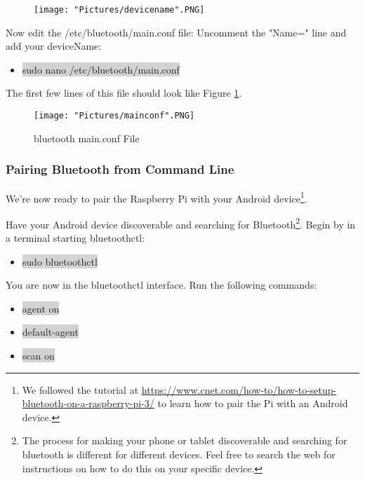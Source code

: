 \documentclass[12pt]{article}
\begin{document}
\begin{figure}[H]
 	\centering
	\texttt{[image: "Pictures/devicename".PNG]}
\end{figure}

\noindent Now edit the /etc/bluetooth/main.conf file: Uncomment the "Name=" line and add your deviceName: 
\begin{itemize}
	\item[] \colorbox{lightgray}{sudo nano /etc/bluetooth/main.conf} 
\end{itemize}

\noindent The first few lines of this file should look like Figure \ref{conf}.

\begin{figure}[H]
 	\centering
	\texttt{[image: "Pictures/mainconf".PNG]}
	\caption{bluetooth main.conf File}
	\label{conf}
\end{figure}

\subsubsection{Pairing Bluetooth from Command Line}
We're now ready to pair the Raspberry Pi with your Android device\footnote{We followed the tutorial at \href{https://www.cnet.com/how-to/how-to-setup-bluetooth-on-a-raspberry-pi-3/}{https://www.cnet.com/how-to/how-to-setup-bluetooth-on-a-raspberry-pi-3/} to learn how to pair the Pi with an Android device.}.

Have your Android device discoverable and searching for Bluetooth\footnote{The process for making your phone or tablet discoverable and searching for bluetooth is different for different devices. Feel free to search the web for instructions on how to do this on your specific device.}. Begin by in a terminal starting bluetoothctl:
\begin{itemize}
	\item[] \colorbox{lightgray}{sudo bluetoothctl}
\end{itemize}

\noindent You are now in the bluetoothctl interface. Run the following commands:

\begin{itemize}
	\item[] \colorbox{lightgray}{agent on}
	\item[] \colorbox{lightgray}{default-agent}
	\item[] \colorbox{lightgray}{scan on}
\end{itemize}
\end{document}
